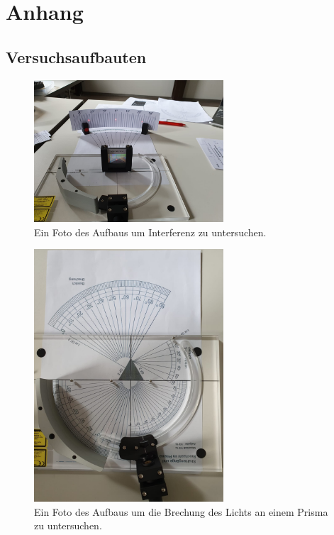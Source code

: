 \newpage
\section{Anhang}

\subsection{Versuchsaufbauten}
\begin{figure}[H]
    \centering
    \includegraphics[width=0.63\textwidth]{latex/images/gitter.jpeg}
    \caption{Ein Foto des Aufbaus um Interferenz zu untersuchen.}
    \label{img:aufbaugitter}
\end{figure}

\begin{figure}[H]
    \centering
    \includegraphics[width=0.63\textwidth]{latex/images/prisma.jpeg}
    \caption{Ein Foto des Aufbaus um die Brechung des Lichts an einem Prisma zu untersuchen.}
    \label{img:aufbauprisma}
\end{figure}


